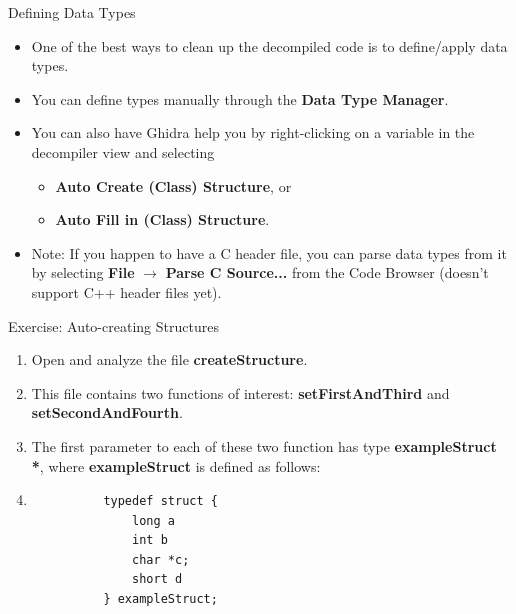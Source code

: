 \documentclass{beamer}
\begin{document}
\begin{frame}
\begin{block}{Defining Data Types}
\begin{itemize}
\item One of the best ways to clean up the decompiled code is to define/apply data types.
\item You can define types manually through the \textbf{Data Type Manager}.
\item You can also have Ghidra help you by right-clicking on a variable in the decompiler view and selecting 
\begin{itemize}
\item \textbf{Auto Create (Class) Structure}, or 
\item \textbf{Auto Fill in (Class) Structure}.
\end{itemize}
\item Note: If you happen to have a C header file, you can parse data types from it by selecting \textbf{File} $\rightarrow$ \textbf{Parse C Source...} 
from the Code Browser (doesn't support C++ header files yet).
\end{itemize}
\end{block}
\end{frame}

\begin{frame}[fragile]
\begin{block}{Exercise: Auto-creating Structures}
\begin{enumerate}
\item Open and analyze the file \textbf{createStructure}.
\item[] This file contains two functions of interest: \textbf{setFirstAndThird} and \textbf{setSecondAndFourth}. 
\item[] The first parameter to each of these two function has type \textbf{exampleStruct *}, where \textbf{exampleStruct} is defined as follows:
\item[] \begin{verbatim}
          typedef struct {
              long a
              int b
              char *c;
              short d
          } exampleStruct;
\end{verbatim}
\end{enumerate}
\end{block}
\end{frame}
\end{document}
